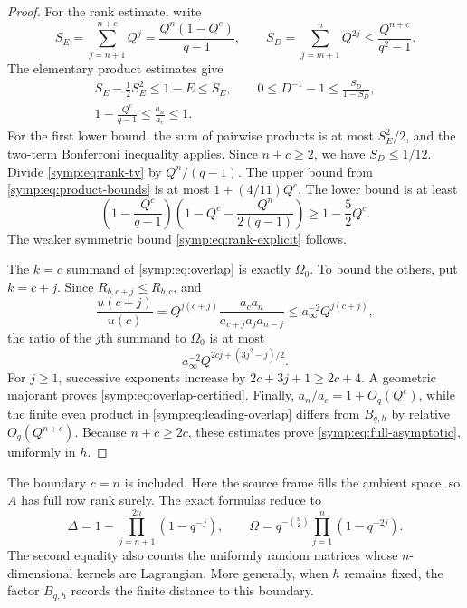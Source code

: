 \begin{proof}
For the rank estimate, write
\[
 S_E=\sum_{j=n+1}^{n+c}Q^j
     =\frac{Q^n(1-Q^c)}{q-1},\qquad
 S_D=\sum_{j=m+1}^{n}Q^{2j}
     \le\frac{Q^{n+c}}{q^2-1}.
\]
The elementary product estimates give
\begin{gather}
 S_E-\tfrac12S_E^2\le1-E\le S_E,\qquad
 0\le D^{-1}-1\le\frac{S_D}{1-S_D},
 \label{symp:eq:product-bounds}\\
 1-\frac{Q^c}{q-1}\le\frac{a_n}{a_c}\le1.
 \nonumber
\end{gather}
For the first lower bound, the sum of pairwise products is at most
$S_E^2/2$, and the two-term Bonferroni inequality applies.  Since
$n+c\ge2$, we have $S_D\le1/12$.  Divide
\eqref{symp:eq:rank-tv} by $Q^n/(q-1)$.  The upper bound from
\eqref{symp:eq:product-bounds} is at most
$1+(4/11)Q^c$.  The lower bound is at least
\[
 \left(1-\frac{Q^c}{q-1}\right)
 \left(1-Q^c-\frac{Q^n}{2(q-1)}\right)
 \ge1-\frac52Q^c.
\]
The weaker symmetric bound \eqref{symp:eq:rank-explicit} follows.

The $k=c$ summand of \eqref{symp:eq:overlap} is exactly
$\Omega_0$.  To bound the others, put $k=c+j$.  Since $R_{b,c+j}\le R_{b,c}$,
and
\begin{equation}
 \frac{u(c+j)}{u(c)}
  =Q^{j(c+j)}\frac{a_ca_n}{a_{c+j}a_ja_{n-j}}
  \le a_\infty^{-2}Q^{j(c+j)},
 \label{symp:eq:overlap-ratio}
\end{equation}
the ratio of the $j$th summand to $\Omega_0$ is at most
\begin{equation}
 a_\infty^{-2}Q^{2cj+(3j^2-j)/2}.
 \label{symp:eq:overlap-tail}
\end{equation}
For $j\ge1$, successive exponents increase by
$2c+3j+1\ge2c+4$.  A geometric majorant proves
\eqref{symp:eq:overlap-certified}.  Finally,
$a_n/a_c=1+O_q(Q^c)$, while the finite even product in
\eqref{symp:eq:leading-overlap} differs from $B_{q,h}$ by relative
$O_q(Q^{n+c})$.  Because $n+c\ge2c$, these estimates prove
\eqref{symp:eq:full-asymptotic}, uniformly in $h$.
\end{proof}

The boundary $c=n$ is included.  Here the source frame fills the ambient
space, so $A$ has full row rank surely.  The exact formulas reduce to
\begin{equation}
 \Delta=1-\prod_{j=n+1}^{2n}(1-q^{-j}),\qquad
 \Omega=q^{-\binom n2}\prod_{j=1}^{n}(1-q^{-2j}).
 \label{symp:eq:saturation}
\end{equation}
The second equality also counts the uniformly random matrices whose
$n$-dimensional kernels are Lagrangian.  More generally, when $h$ remains
fixed, the factor $B_{q,h}$ records the finite distance to this boundary.

